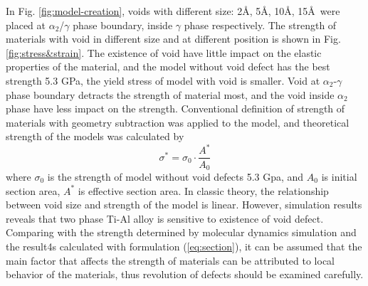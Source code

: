 \documentclass[Unknown,article,submit,moreauthors,pdftex,10pt,a4paper]{Definitions/mdpi}
\begin{document}
In Fig. \ref{fig:model-creation}, voids with different size: 2\AA, 5\AA, 10\AA, 15\AA\ were placed  at $\alpha_2$/$\gamma$ phase boundary, inside $\gamma$ phase respectively. The strength of materials with void in different size and at different position is shown in Fig.\ref{fig:stress&strain}. The existence of void have little impact on the elastic properties of the material, and the model without void defect has the best strength 5.3 GPa, the yield stress of model with void is smaller. Void at $\alpha_2$-$\gamma$ phase boundary  detracts the strength of  material most, and the void inside $\alpha_2$ phase  have less impact on the strength.          
Conventional definition of strength of materials with geometry subtraction was applied to the model, and theoretical strength of the models was calculated by
\begin{equation} \label{eq:section} 
\sigma^* = \sigma_0 \cdot \frac{A^*}{A_0}
\end{equation}
where $\sigma_0$ is the strength of model without void defects 5.3 Gpa, and $A_0$ is initial section area,  $A^*$ is effective section area.  In classic theory, the relationship between void size and strength of the model is linear. However, simulation results reveals that two phase Ti-Al alloy is sensitive to existence of void defect.  Comparing with the strength determined by molecular dynamics simulation and the result4s calculated with formulation (\ref{eq:section}), it can be assumed that the main factor that affects the strength of materials can be attributed to local behavior of the materials, thus revolution of defects should be examined carefully.
\end{document}
